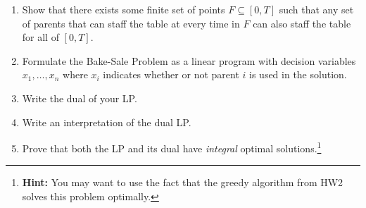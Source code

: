 \documentclass[11pt]{article}
\theoremstyle{definition}
\begin{document}
\begin{enumerate}[leftmargin=0pt, itemsep=3ex]
\begin{enumerate}[leftmargin=0pt, itemsep=1ex]
    \item Show that there exists some finite set of points $F \subseteq [0,T]$ such that any set of parents that can staff the table at every time in $F$ can also staff the table for all of $[0,T]$.
    
    \item Formulate the Bake-Sale Problem as a linear program with decision variables $x_1,\dots,x_n$ where $x_i$ indicates whether or not parent $i$ is used in the solution.
    
    \item Write the dual of your LP.
    
    \item Write an interpretation of the dual LP.
    
    \item Prove that both the LP and its dual have \emph{integral} optimal solutions.\footnote{\textbf{Hint:} You may want to use the fact that the greedy algorithm from HW2 solves this problem optimally.}
\end{enumerate}
\end{enumerate}
\end{document}
